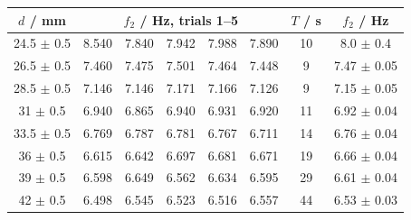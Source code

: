 \begin{tabular}{@{}cccccccc@{}}
\toprule
$d$ / mm & \multicolumn{5}{c}{$f_2$ / Hz, trials 1--5} & $T$ / s & $f_2$ / Hz \\
\midrule
24.5 $\pm$ 0.5 & 8.540 & 7.840 & 7.942 & 7.988 & 7.890 & 10 & 8.0 $\pm$ 0.4 \\
26.5 $\pm$ 0.5 & 7.460 & 7.475 & 7.501 & 7.464 & 7.448 & 9 & 7.47 $\pm$ 0.05 \\
28.5 $\pm$ 0.5 & 7.146 & 7.146 & 7.171 & 7.166 & 7.126 & 9 & 7.15 $\pm$ 0.05 \\
31 $\pm$ 0.5 & 6.940 & 6.865 & 6.940 & 6.931 & 6.920 & 11 & 6.92 $\pm$ 0.04 \\
33.5 $\pm$ 0.5 & 6.769 & 6.787 & 6.781 & 6.767 & 6.711 & 14 & 6.76 $\pm$ 0.04 \\
36 $\pm$ 0.5 & 6.615 & 6.642 & 6.697 & 6.681 & 6.671 & 19 & 6.66 $\pm$ 0.04 \\
39 $\pm$ 0.5 & 6.598 & 6.649 & 6.562 & 6.634 & 6.595 & 29 & 6.61 $\pm$ 0.04 \\
42 $\pm$ 0.5 & 6.498 & 6.545 & 6.523 & 6.516 & 6.557 & 44 & 6.53 $\pm$ 0.03 \\
\bottomrule
\end{tabular}